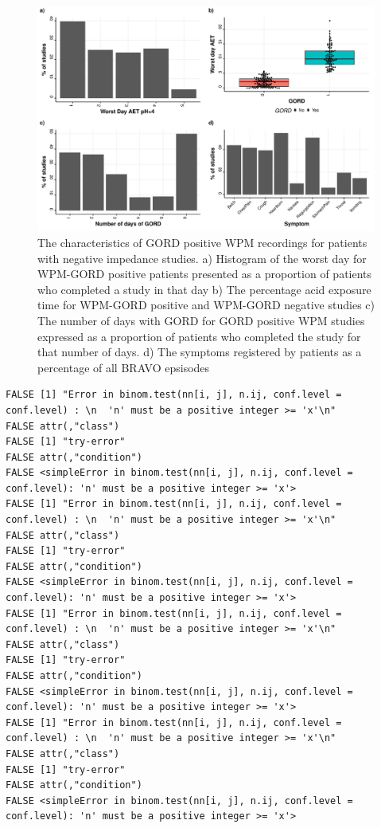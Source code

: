 \documentclass[english,man,floatsintext]{apa6}
\begin{document}
\begin{figure}

\includegraphics{TemplateReport_files/figure-latex/BRAVOdescription-1} \hfill{}

\caption{The characteristics of GORD positive WPM recordings for patients with negative impedance studies. a) Histogram of the worst day for WPM-GORD positive patients presented as a proportion of patients who completed a study in that day b) The percentage acid exposure time for WPM-GORD positive and WPM-GORD negative studies c) The number of days with GORD for GORD positive WPM studies expressed as a proportion of patients who completed the study for that number of days. d) The symptoms registered by patients as a percentage of all BRAVO epsisodes}\label{fig:BRAVOdescription}
\end{figure}

\begin{verbatim}
FALSE [1] "Error in binom.test(nn[i, j], n.ij, conf.level = conf.level) : \n  'n' must be a positive integer >= 'x'\n"
FALSE attr(,"class")
FALSE [1] "try-error"
FALSE attr(,"condition")
FALSE <simpleError in binom.test(nn[i, j], n.ij, conf.level = conf.level): 'n' must be a positive integer >= 'x'>
FALSE [1] "Error in binom.test(nn[i, j], n.ij, conf.level = conf.level) : \n  'n' must be a positive integer >= 'x'\n"
FALSE attr(,"class")
FALSE [1] "try-error"
FALSE attr(,"condition")
FALSE <simpleError in binom.test(nn[i, j], n.ij, conf.level = conf.level): 'n' must be a positive integer >= 'x'>
FALSE [1] "Error in binom.test(nn[i, j], n.ij, conf.level = conf.level) : \n  'n' must be a positive integer >= 'x'\n"
FALSE attr(,"class")
FALSE [1] "try-error"
FALSE attr(,"condition")
FALSE <simpleError in binom.test(nn[i, j], n.ij, conf.level = conf.level): 'n' must be a positive integer >= 'x'>
FALSE [1] "Error in binom.test(nn[i, j], n.ij, conf.level = conf.level) : \n  'n' must be a positive integer >= 'x'\n"
FALSE attr(,"class")
FALSE [1] "try-error"
FALSE attr(,"condition")
FALSE <simpleError in binom.test(nn[i, j], n.ij, conf.level = conf.level): 'n' must be a positive integer >= 'x'>
\end{verbatim}
\end{document}
